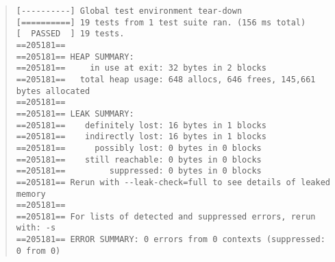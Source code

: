 \documentclass[10pt]{article}
\begin{document}
\begin{itemize}
\begin{scriptsize}
\begin{quote}
\begin{verbatim}
[----------] Global test environment tear-down
[==========] 19 tests from 1 test suite ran. (156 ms total)
[  PASSED  ] 19 tests.
==205181== 
==205181== HEAP SUMMARY:
==205181==     in use at exit: 32 bytes in 2 blocks
==205181==   total heap usage: 648 allocs, 646 frees, 145,661 bytes allocated
==205181== 
==205181== LEAK SUMMARY:
==205181==    definitely lost: 16 bytes in 1 blocks
==205181==    indirectly lost: 16 bytes in 1 blocks
==205181==      possibly lost: 0 bytes in 0 blocks
==205181==    still reachable: 0 bytes in 0 blocks
==205181==         suppressed: 0 bytes in 0 blocks
==205181== Rerun with --leak-check=full to see details of leaked memory
==205181== 
==205181== For lists of detected and suppressed errors, rerun with: -s
==205181== ERROR SUMMARY: 0 errors from 0 contexts (suppressed: 0 from 0)
\end{verbatim}
\end{quote}
\end{scriptsize}
\end{itemize}
\end{document}
